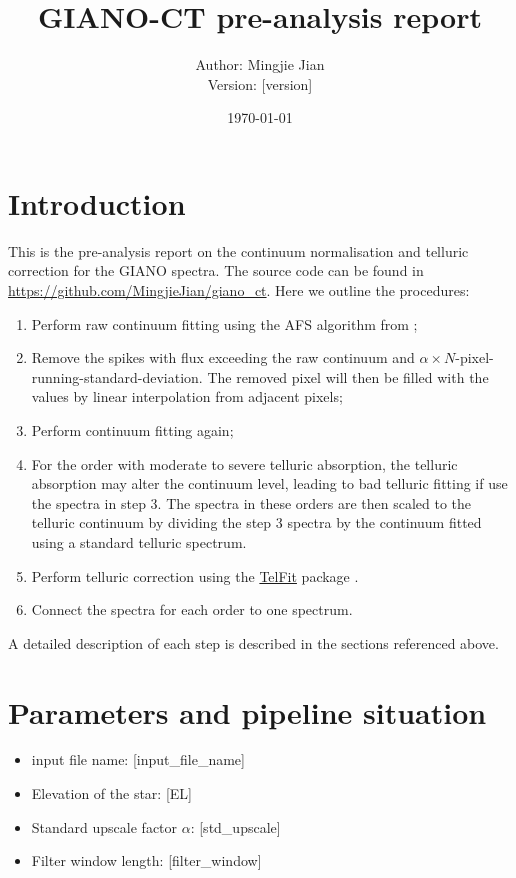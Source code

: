 \documentclass{article}
\title{GIANO-CT pre-analysis report}
\author{Author: Mingjie Jian \\Version: [version]}
\date{\today}
\begin{document}
\maketitle

\tableofcontents

\section{Introduction}

This is the pre-analysis report on the continuum normalisation and telluric correction for the GIANO spectra. 
The source code can be found in \url{https://github.com/MingjieJian/giano_ct}.
Here we outline the procedures:
\begin{enumerate}
    \item Perform raw continuum fitting using the AFS algorithm from \citet[][the same algorithm is also used below]{Xu2019};
    \item Remove the spikes with flux exceeding the raw continuum and $\alpha \times N$-pixel-running-standard-deviation. The removed pixel will then be filled with the values by linear interpolation from adjacent pixels; 
    \item Perform continuum fitting again;
    \item For the order with moderate to severe telluric absorption, the telluric absorption may alter the continuum level, leading to bad telluric fitting if use the spectra in step 3. The spectra in these orders are then scaled to the telluric continuum by dividing the step 3 spectra by the continuum fitted using a standard telluric spectrum.
    \item Perform telluric correction using the \hyperlink{https://github.com/kgullikson88/Telluric-Fitter}{TelFit} package \citep{Gullikson2014}.
    \item Connect the spectra for each order to one spectrum.
\end{enumerate}

A detailed description of each step is described in the sections referenced above.

\section{Parameters and pipeline situation}

\begin{itemize}
    \item input file name: [input_file_name]
    \item Elevation of the star: [EL] \degree
    \item Standard upscale factor $\alpha$: [std_upscale]
    \item Filter window length: [filter_window]
\end{itemize}
\end{document}
